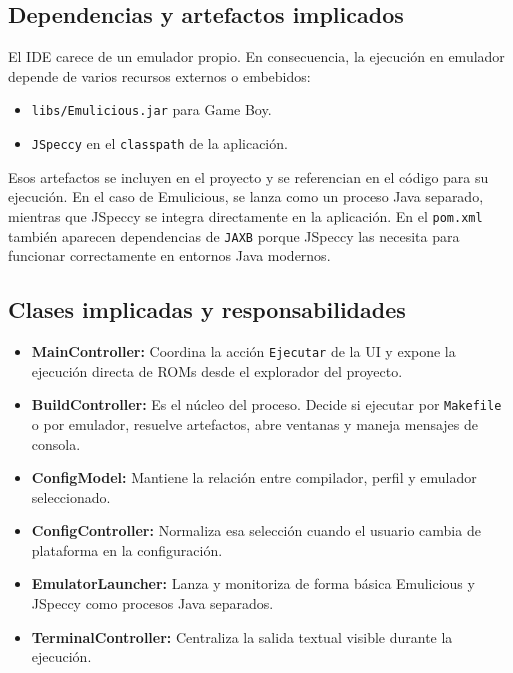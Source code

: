 \documentclass[../../main.tex]{subfiles}
\begin{document}
\subsection{Dependencias y artefactos implicados}

El IDE carece de un emulador propio. En consecuencia, la ejecución en emulador depende de varios recursos externos o embebidos:

\begin{itemize}
    \item \lstinline|libs/Emulicious.jar| para Game Boy.
    \item \lstinline|JSpeccy| en el \lstinline|classpath| de la aplicación.
\end{itemize}

Esos artefactos se incluyen en el proyecto y se referencian en el código para su ejecución. En el caso de Emulicious, se lanza como un proceso Java separado, mientras que JSpeccy se integra directamente en la aplicación. En el \lstinline|pom.xml| también aparecen dependencias de \lstinline|JAXB| porque JSpeccy las necesita para funcionar correctamente en entornos Java modernos.

\clearpage

\subsection{Clases implicadas y responsabilidades}

\begin{itemize}
    \item \textbf{MainController:} Coordina la acción \lstinline|Ejecutar| de la UI y expone la ejecución directa de ROMs desde el explorador del proyecto.
    \item \textbf{BuildController:} Es el núcleo del proceso. Decide si ejecutar por \lstinline|Makefile| o por emulador, resuelve artefactos, abre ventanas y maneja mensajes de consola.
    \item \textbf{ConfigModel:} Mantiene la relación entre compilador, perfil y emulador seleccionado.
    \item \textbf{ConfigController:} Normaliza esa selección cuando el usuario cambia de plataforma en la configuración.
    \item \textbf{EmulatorLauncher:} Lanza y monitoriza de forma básica Emulicious y JSpeccy como procesos Java separados.
    \item \textbf{TerminalController:} Centraliza la salida textual visible durante la ejecución.
\end{itemize}
\end{document}
